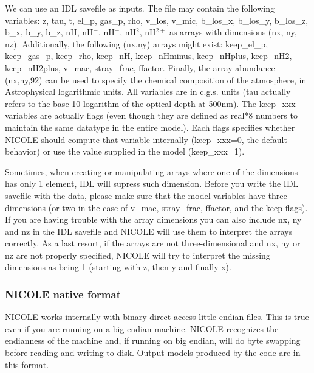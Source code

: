 We can use an IDL savefile as inputs. The file may contain the
following variables: z, tau, t, el\_p, gas\_p, rho, v\_los, v\_mic,
b\_los\_x, b\_los\_y, b\_los\_z, b\_x, b\_y, b\_z, nH, nH$^-$, nH$^+$,
nH$^2$, nH$^{2+}$ as arrays with dimensions (nx, ny,
nz). Additionally, the following (nx,ny) arrays might exist:
keep\_el\_p, keep\_gas\_p, keep\_rho, keep\_nH, keep\_nHminus,
keep\_nHplus, keep\_nH2, keep\_nH2plus, v\_mac, stray\_frac,
ffactor. Finally, the array abundance (nx,ny,92) can be used to
specify the chemical composition of the atmosphere, in Astrophysical
logarithmic units. All variables are in c.g.s. units (tau actually
refers to the base-10 logarithm of the optical depth at 500nm). The
keep\_xxx variables are actually flags (even though they are defined
as real*8 numbers to maintain the same datatype in the entire
model). Each flags specifies whether NICOLE should compute that
variable internally (keep\_xxx=0, the default behavior) or use the
value supplied in the model (keep\_xxx=1).

Sometimes, when creating or manipulating arrays where one of the
dimensions has only 1 element, IDL will supress such dimension. Before
you write the IDL savefile with the data, please make sure that the
model variables have three dimensions (or two in the case of v\_mac,
stray\_frac, ffactor, and the keep flags). If you are having trouble
with the array dimensions you can also include nx, ny and nz in the
IDL savefile and NICOLE will use them to interpret the arrays
correctly. As a last resort, if the arrays are not three-dimensional
and nx, ny or nz are not properly specified, NICOLE will try to
interpret the missing dimensions as being 1 (starting with z, then y
and finally x).

\subsubsection{NICOLE native format}

NICOLE works internally with binary direct-access little-endian
files. This is true even if you are running on a big-endian
machine. NICOLE recognizes the endianness of the machine and, if
running on big endian, will do byte swapping before reading and
writing to disk. Output models produced by the code are in this format.

